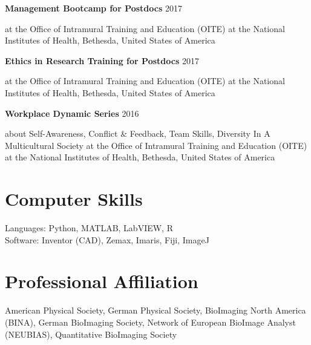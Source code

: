 \documentclass[margin,line]{res}
\begin{document}
\begin{resume}
\vspace*{-2mm}

{\bf Management Bootcamp for Postdocs} \hfill {2017}\\
\vspace*{-3.5mm}
\begin{addmargin}[0pt]{.1\linewidth}
\vspace*{-1mm}
at the Office of Intramural Training and Education (OITE) at the National Institutes of Health, Bethesda, United States of America
\end{addmargin}

\vspace*{-2mm}

{\bf Ethics in Research Training for Postdocs} \hfill {2017}\\
\vspace*{-3.5mm}
\begin{addmargin}[0pt]{.1\linewidth}
\vspace*{-1mm}
at the Office of Intramural Training and Education (OITE) at the National Institutes of Health, Bethesda, United States of America
\end{addmargin}

\vspace*{-2mm}

{\bf Workplace Dynamic Series} \hfill {2016}\\
\vspace*{-3.5mm}
\begin{addmargin}[0pt]{.1\linewidth}
\vspace*{-1mm}
about Self-Awareness, Conflict \& Feedback, Team Skills, Diversity In A Multicultural Society at the Office of Intramural Training and Education (OITE) at the National Institutes of Health, Bethesda, United States of America
\end{addmargin}


\section{\sc Computer Skills} 

Languages:  Python, MATLAB, LabVIEW, R\\ %
Software: Inventor (CAD), Zemax, Imaris, Fiji, ImageJ


\section{\sc Professional Affiliation} 
American Physical Society, German Physical Society, BioImaging North America (BINA), German BioImaging Society, Network of European BioImage Analyst (NEUBIAS), Quantitative BioImaging Society


\end{resume}
\end{document}
